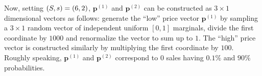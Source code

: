 \documentclass[opre,sglanonrev]{informs4}
\numberwithin{equation}{section}
\newcommand{\pow}[1]{^{(#1)}}
\newcommand{\Pbb}{\mathbb{P}}
\newcommand\numberthis{\addtocounter{equation}{1}\tag{\theequation}}
\newcommand{\prob}{\Pbb}
\begin{document}
{{{{{Now, setting $(\texttt{\textbf{S}},\texttt{\textbf{s}})=(6,2)$, $\textbf{p}\pow 1$ and $\textbf{p}\pow 2$ can be constructed as $3\times 1$ dimensional vectors as follows: generate the ``low'' price vector $\textbf{p}\pow 1$ by sampling a $3\times1$ random vector of independent uniform $[0,1]$ marginals, divide the first coordinate by $1000$ and renormalize the vector to sum up to $1$. The ``high'' price vector is constructed similarly by multiplying the first coordinate by $100$. Roughly speaking, $\textbf{p}\pow 1$ and $\textbf{p}\pow 2$ correspond to $0$ sales having $0.1\%$ and $90\%$ probabilities.




 
}}}}}
\end{document}
